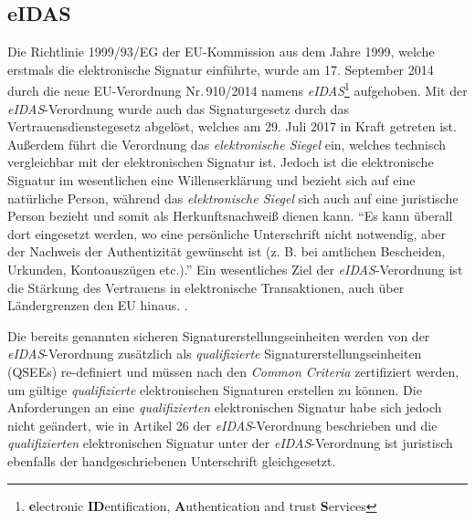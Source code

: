 \documentclass[11pt,a4paper,ngerman]{scrreprt}
\begin{document}
\subsection{eIDAS}\label{sec:eidas}
Die Richtlinie 1999/93/EG der EU-Kommission aus dem Jahre 1999, welche erstmals die elektronische Signatur einführte, wurde am 17. September 2014 durch die neue EU-Verordnung Nr.\,910/2014 namens \textit{eIDAS}\footnote{\textbf{e}lectronic \textbf{ID}entification, \textbf{A}uthentication and trust \textbf{S}ervices} aufgehoben. Mit der \emph{eIDAS}-Verordnung wurde auch das Signaturgesetz durch das Vertrauensdienstegesetz abgelöst, welches am 29. Juli 2017 in Kraft getreten ist. Außerdem führt die Verordnung das \textit{elektronische Siegel} ein, welches technisch vergleichbar mit der elektronischen Signatur ist. Jedoch ist die elektronische Signatur im wesentlichen eine Willenserklärung und bezieht sich auf eine natürliche Person, während das \textit{elektronische Siegel} sich auch auf eine juristische Person bezieht und somit als Herkunftsnachweiß dienen kann. ``Es kann überall dort eingesetzt werden, wo eine persönliche Unterschrift nicht notwendig, aber der Nachweis der Authentizität gewünscht ist (z. B. bei amtlichen Bescheiden, Urkunden, Kontoauszügen etc.).''\cite{eu910/2014Website} Ein wesentliches Ziel der \textit{eIDAS}-Verordnung ist die Stärkung des Vertrauens in elektronische Transaktionen, auch über Ländergrenzen den EU hinaus. \cite{eu910/2014}.

Die bereits genannten sicheren Signaturerstellungseinheiten werden von der \textit{eIDAS}-Verordnung zusätzlich als \emph{qualifizierte} Signaturerstellungseinheiten (QSEEs) re-definiert und müssen nach den \textit{Common Criteria} zertifiziert werden, um gültige \emph{qualifizierte} elektronischen Signaturen erstellen zu können. Die Anforderungen an eine \emph{qualifizierten} elektronischen Signatur habe sich jedoch nicht geändert, wie in Artikel 26 der \textit{eIDAS}-Verordnung beschrieben \cite[Article 26]{eidasWebsite} und die \emph{qualifizierten} elektronischen Signatur unter der \textit{eIDAS}-Verordnung ist juristisch ebenfalls der handgeschriebenen Unterschrift gleichgesetzt.
\end{document}
